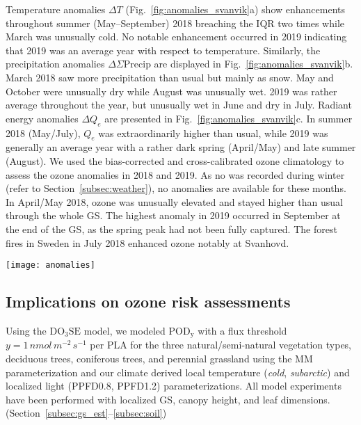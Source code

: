 \documentclass[bg, manuscript]{copernicus}
\begin{document}
Temperature anomalies $\Delta T$ (Fig.~\ref{fig:anomalies_svanvik}a) show enhancements throughout summer (May--September) 2018 breaching the IQR two times while March was unusually cold. No notable enhancement occurred in 2019 indicating that 2019 was an average year with respect to temperature. Similarly, the precipitation anomalies $\Delta\Sigma\mathrm{Precip}$ are displayed in Fig.~\ref{fig:anomalies_svanvik}b. March 2018 saw more precipitation than usual but mainly as snow. May and October were unusually dry while August was unusually wet. 2019 was rather average throughout the year, but unusually wet in June and dry in July. Radiant energy anomalies $\Delta Q_e$ are presented in Fig.~\ref{fig:anomalies_svanvik}c. In summer 2018 (May/July), $Q_e$ was extraordinarily higher than usual, while 2019 was generally an average year with a rather dark spring (April/May) and late summer (August).
We used the bias-corrected and cross-calibrated ozone climatology \citep{ACP:Falk2021} to assess the ozone anomalies in 2018 and 2019. As no \chem{[O_3]} was recorded during winter (refer to Section~\ref{subsec:weather}), no anomalies are available for these months. In April/May 2018, ozone was unusually elevated and stayed higher than usual through the whole GS. The highest anomaly in 2019 occurred in September at the end of the GS, as the spring peak had not been fully captured. The forest fires in Sweden in July 2018 enhanced ozone notably at Svanhovd.

\begin{figure*}[t]
  
  \centering
  \texttt{[image: anomalies]}
  \caption{2018 and 2019 anomalies of key environmental variables at Svanhovd displayed as difference from median for each month. The hatched area between indicates the IQR. (a) Temperature; (b) precipitation; (c) radiant energy; (d) ozone VMR.}
  \label{fig:anomalies_svanvik}
\end{figure*}


\subsection{Implications on ozone risk assessments}
\label{subsec:do3se_results}

Using the $\mathrm{DO_3SE}$ model, we modeled $\mathrm{POD_y}$ with a flux threshold $y=1\,\unit{nmol\,m^{-2}\,s^{-1}}$ per PLA for the three natural/semi-natural vegetation types, deciduous trees, coniferous trees, and perennial grassland using the MM parameterization and our climate derived local temperature (\emph{cold}, \emph{subarctic}) and localized light (PPFD0.8, PPFD1.2) parameterizations. All model experiments have been performed with localized GS, canopy height, and leaf dimensions. (Section~\ref{subsec:gs_est}--\ref{subsec:soil})
\end{document}
